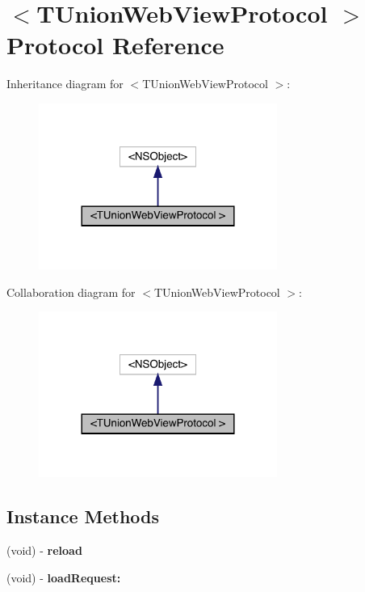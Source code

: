 \hypertarget{protocol_t_union_web_view_protocol_01-p}{}\section{$<$T\+Union\+Web\+View\+Protocol $>$ Protocol Reference}
\label{protocol_t_union_web_view_protocol_01-p}


Inheritance diagram for $<$T\+Union\+Web\+View\+Protocol $>$\+:\nopagebreak
\begin{figure}[H]
\begin{center}
\leavevmode
\includegraphics[width=221pt]{protocol_t_union_web_view_protocol_01-p__inherit__graph}
\end{center}
\end{figure}


Collaboration diagram for $<$T\+Union\+Web\+View\+Protocol $>$\+:\nopagebreak
\begin{figure}[H]
\begin{center}
\leavevmode
\includegraphics[width=221pt]{protocol_t_union_web_view_protocol_01-p__coll__graph}
\end{center}
\end{figure}
\subsection*{Instance Methods}
\begin{DoxyCompactItemize}
\item 
\mbox{\label{protocol_t_union_web_view_protocol_01-p_a228ff404e929618ba332700efb7e3853}} 
(void) -\/ {\bfseries reload}
\item 
\mbox{\label{protocol_t_union_web_view_protocol_01-p_a5ac46e926760ac2955e25d47e6de0fb6}} 
(void) -\/ {\bfseries load\+Request\+:}
\end{DoxyCompactItemize}
